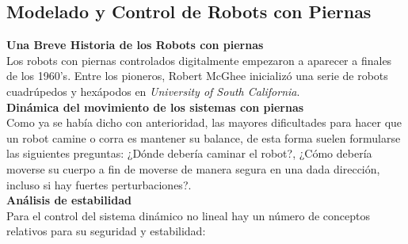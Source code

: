 \documentclass{book}
\begin{document}
\subsection{Modelado y Control de Robots con Piernas}
	\textbf{Una Breve Historia de los Robots con piernas}\\
		Los robots con piernas controlados digitalmente empezaron a aparecer a finales de los 1960's. Entre los pioneros, Robert McGhee inicializó una serie de robots cuadrúpedos y hexápodos en \textit{University of South California}.\\

	\textbf{Dinámica del movimiento de los sistemas con piernas}\\
Como ya se había dicho con anterioridad, las mayores dificultades para hacer que un robot camine o corra es mantener su balance, de esta forma suelen formularse las siguientes preguntas: ¿Dónde debería caminar el robot?, ¿Cómo debería moverse su cuerpo a fin de moverse de manera segura en una dada dirección, incluso si hay fuertes perturbaciones?.\\ 

	\textbf{Análisis de estabilidad}\\
Para el control del sistema dinámico no lineal hay  un número de conceptos relativos para su seguridad y estabilidad:
\end{document}
